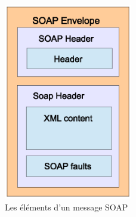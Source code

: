 \begin{figure}[h]
    \centering
    \includegraphics[width=0.5\textwidth]{figs/soap_structure.eps}
    \caption{ Les éléments d'un message \textsc{SOAP}}
    \label{fig:soap-message-structure}
\end{figure}
